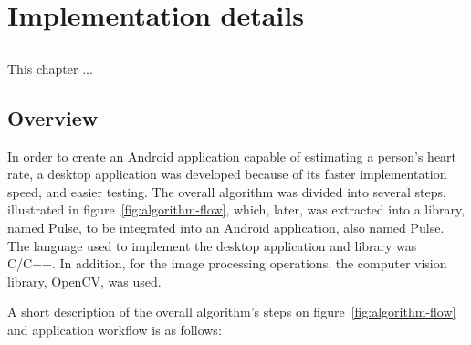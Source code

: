 \chapter{Implementation details} \label{chap:impl}

\section*{}


This chapter ...

\section{Overview} \label{sec:sol:overview}


In order to create an Android application capable of estimating a person's
heart rate, a desktop application was developed because of 
its faster implementation speed, and easier testing.
The overall algorithm was divided into several steps, illustrated in
figure~\ref{fig:algorithm-flow}, which, later, was extracted into a
library, named Pulse, to be integrated into an Android application, 
also named Pulse.
The language used to implement the desktop application and library
was C/C++. In addition, for the image processing operations, the
computer vision library, OpenCV, was used.

A short description of the overall algorithm's steps on 
figure~\ref{fig:algorithm-flow} and application workflow is as follows:

